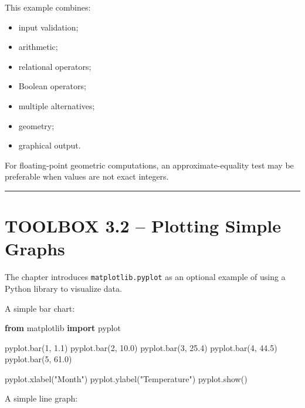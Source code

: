 \documentclass[
  11pt,
  a4paper,
]{article}
\newenvironment{Shaded}{}{}
\newcommand{\DecValTok}[1]{\textcolor[rgb]{0.25,0.63,0.44}{#1}}
\newcommand{\FloatTok}[1]{\textcolor[rgb]{0.25,0.63,0.44}{#1}}
\newcommand{\ImportTok}[1]{\textcolor[rgb]{0.00,0.50,0.00}{\textbf{#1}}}
\newcommand{\NormalTok}[1]{#1}
\newcommand{\StringTok}[1]{\textcolor[rgb]{0.25,0.44,0.63}{#1}}
\providecommand{\tightlist}{%
  \setlength{\itemsep}{0pt}\setlength{\parskip}{0pt}}
\begin{document}
This example combines:

\begin{itemize}
\tightlist
\item
  input validation;
\item
  arithmetic;
\item
  relational operators;
\item
  Boolean operators;
\item
  multiple alternatives;
\item
  geometry;
\item
  graphical output.
\end{itemize}

For floating-point geometric computations, an approximate-equality test
may be preferable when values are not exact integers.

\begin{center}\rule{0.5\linewidth}{0.5pt}\end{center}

\section{TOOLBOX 3.2 -- Plotting Simple
Graphs}\label{toolbox-3.2-plotting-simple-graphs}

The chapter introduces \texttt{matplotlib.pyplot} as an optional example
of using a Python library to visualize data.

A simple bar chart:

\begin{Shaded}
\begin{Highlighting}[]
\ImportTok{from}\NormalTok{ matplotlib }\ImportTok{import}\NormalTok{ pyplot}

\NormalTok{pyplot.bar(}\DecValTok{1}\NormalTok{, }\FloatTok{1.1}\NormalTok{)}
\NormalTok{pyplot.bar(}\DecValTok{2}\NormalTok{, }\FloatTok{10.0}\NormalTok{)}
\NormalTok{pyplot.bar(}\DecValTok{3}\NormalTok{, }\FloatTok{25.4}\NormalTok{)}
\NormalTok{pyplot.bar(}\DecValTok{4}\NormalTok{, }\FloatTok{44.5}\NormalTok{)}
\NormalTok{pyplot.bar(}\DecValTok{5}\NormalTok{, }\FloatTok{61.0}\NormalTok{)}

\NormalTok{pyplot.xlabel(}\StringTok{"Month"}\NormalTok{)}
\NormalTok{pyplot.ylabel(}\StringTok{"Temperature"}\NormalTok{)}
\NormalTok{pyplot.show()}
\end{Highlighting}
\end{Shaded}

A simple line graph:
\end{document}
